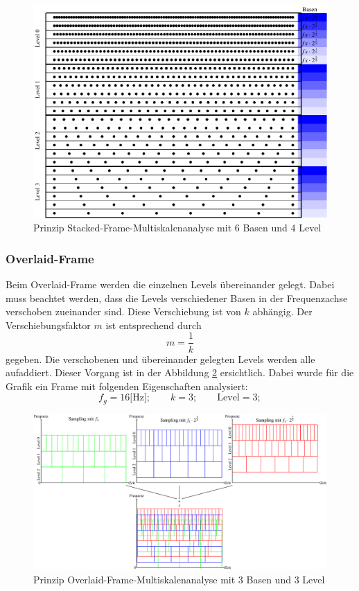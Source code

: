 \begin{figure}[!ht]
	\centering
	\includegraphics[width=\linewidth]{papers/autotune/sections/frames/images/msa/msa.pdf}
	\caption{Prinzip Stacked-Frame-Multiskalenanalyse mit 6 Basen und 4 Level}\label{fig:Stacked_frame}
\end{figure}%

\newpage


\subsubsection{Overlaid-Frame}

Beim Overlaid-Frame werden die einzelnen Levels übereinander gelegt. Dabei muss beachtet werden, dass die Levels verschiedener Basen in der Frequenzachse verschoben zueinander sind. Diese Verschiebung ist von $k$ abhängig. Der Verschiebungsfaktor $m$ ist entsprechend durch
\[
m= \frac{1}{k}
\]
gegeben. Die verschobenen und übereinander gelegten Levels werden alle aufaddiert. Dieser Vorgang ist in der Abbildung \ref{fig:Overlaid_frame} ersichtlich. Dabei wurde für die Grafik ein Frame mit folgenden Eigenschaften analysiert:
\[ 
f_{g}=16\text{[Hz]}; \qquad
k = 3; \qquad
\text{Level} = 3; 
\]

\begin{figure}[!ht]
	\centering
	\includegraphics[width=\linewidth]{papers/autotune/sections/frames/images/frame/msa.pdf}
	\caption{Prinzip Overlaid-Frame-Multiskalenanalyse mit 3 Basen und 3 Level}\label{fig:Overlaid_frame}
\end{figure}%


